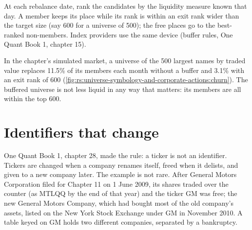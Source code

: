 \begin{method}\label{met:rs:universe-symbology-and-corporate-actions:buffer}
At each rebalance date, rank the candidates by the liquidity measure known that day. A member keeps its place while its rank
is within an exit rank wider than the target size (say 600 for a universe of 500); the free places go to the best-ranked
non-members. Index providers use the same device (buffer rules, One Quant Book 1, chapter 15).
\end{method}

In the chapter's simulated market, a universe of the 500 largest names by traded value replaces 11.5\% of its members each
month without a buffer and 3.1\% with an exit rank of 600 (\cref{fig:rs:universe-symbology-and-corporate-actions:churn}). The
buffered universe is not less liquid in any way that matters: its members are all within the top 600.

\begin{omfigure}

\label{fig:rs:universe-symbology-and-corporate-actions:churn}
\end{omfigure}

\section{Identifiers that change}

One Quant Book 1, chapter 28, made the rule: a ticker is not an identifier. Tickers are changed when a company renames
itself, freed when it delists, and given to a new company later. The example is not rare. After General Motors Corporation
filed for Chapter 11 on 1 June 2009, its shares traded over the counter (as MTLQQ by the end of that year) and the ticker GM
was free; the new General Motors Company, which had bought most of the old company's assets, listed on the New York Stock
Exchange under GM in November 2010. A table keyed on GM holds two different companies, separated by a bankruptcy.

